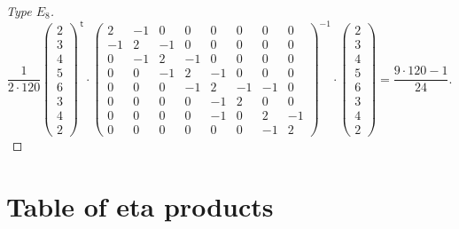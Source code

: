 \documentclass{article}
\theoremstyle{definition}
\renewcommand{\top}{\,\mathsf{t}}
\begin{document}
\begin{proof}[Type $E_8$]
	\[ 
	\frac{1}{2\cdot 120}
	\begin{pmatrix}
	2 \\ 3 \\ 4 \\5  \\ 6 \\ 3 \\ 4 \\ 2
	\end{pmatrix}^{\top}
	\cdot
	\begin{pmatrix}
	2 & -1 & 0 & 0 & 0 & 0 & 0 & 0\\
	-1 & 2 & -1 & 0 & 0 & 0 & 0 & 0\\
	0 & -1 & 2 & -1 & 0 & 0 & 0 & 0 \\
	0 & 0 & -1 & 2 & -1 & 0 & 0 & 0 \\
	0 & 0 & 0 & -1 & 2 & -1 & -1 & 0 \\
	0 & 0 & 0 & 0 & -1 & 2 & 0 & 0 \\
	0 & 0 & 0 & 0  & -1 & 0 & 2 & -1 \\
	0 & 0 & 0 & 0 & 0  & 0 & -1 & 2
	\end{pmatrix}^{-1} 
	\cdot
	\begin{pmatrix}
	2 \\ 3 \\ 4 \\5  \\ 6 \\ 3 \\ 4 \\ 2
	\end{pmatrix}
	=\frac{9\cdot 120-1}{24}.
	\]
\end{proof}

\section{Table of eta products}
\renewcommand{\arraystretch}{1.5}
\end{document}
